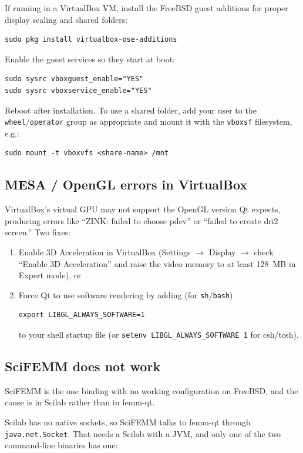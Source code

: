 \documentclass[11pt]{article}
\begin{document}
If running in a VirtualBox VM, install the FreeBSD guest additions for proper
display scaling and shared folders:
\begin{lstlisting}
sudo pkg install virtualbox-ose-additions
\end{lstlisting}
Enable the guest services so they start at boot:
\begin{lstlisting}
sudo sysrc vboxguest_enable="YES"
sudo sysrc vboxservice_enable="YES"
\end{lstlisting}
Reboot after installation.  To use a shared folder, add your user to the
\texttt{wheel}/\texttt{operator} group as appropriate and mount it with the
\texttt{vboxsf} filesystem, e.g.:
\begin{lstlisting}
sudo mount -t vboxvfs <share-name> /mnt
\end{lstlisting}

\subsection{MESA / OpenGL errors in VirtualBox}

VirtualBox's virtual GPU may not support the OpenGL version Qt expects,
producing errors like ``ZINK: failed to choose pdev'' or ``failed to create
dri2 screen.''  Two fixes:

\begin{enumerate}[nosep]
\item Enable 3D Acceleration in VirtualBox (Settings $\rightarrow$ Display
      $\rightarrow$ check ``Enable 3D Acceleration'' and raise the video
      memory to at least 128~MB in Expert mode), or
\item Force Qt to use software rendering by adding (for \texttt{sh}/\texttt{bash})
\begin{lstlisting}
export LIBGL_ALWAYS_SOFTWARE=1
\end{lstlisting}
to your shell startup file (or \texttt{setenv LIBGL\_ALWAYS\_SOFTWARE 1} for
csh/tcsh).
\end{enumerate}

\subsection{SciFEMM does not work}

SciFEMM is the one binding with no working configuration on FreeBSD, and the
cause is in Scilab rather than in femm-qt.

Scilab has no native sockets, so SciFEMM talks to femm-qt through
\texttt{java.net.Socket}.  That needs a Scilab with a JVM, and only one of the
two command-line binaries has one:
\end{document}
